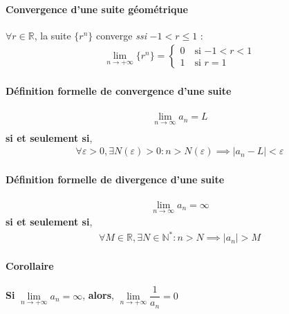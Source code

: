 \documentclass{report}
\begin{document}
\begin{multicols*}{3}
        \paragraph{Convergence d'une suite géométrique}
        $\forall r \in \mathbb{R}$, la suite $\{r^n\}$ converge        
        \textit{ssi} $-1 < r \leq 1$ : 
        \begin{align*}
            \lim\limits_{n\to+\infty }\{r^n\} = 
                    \begin{cases}
                        0 \quad \text{si $-1 < r < 1$} \\
                        1 \quad \text{si $r = 1$}
                    \end{cases}
        \end{align*}


        

    \paragraph{Définition formelle de convergence d'une suite}
      \begin{align*}
        \lim\limits_{n \to\infty  }{a_n} = L \\
      \end{align*}
      \textbf{si et seulement si}, 
      \begin{align*}
        \forall\varepsilon > 0, \exists N\left( \varepsilon \right) > 0 : 
        n > N\left( \varepsilon \right) \implies 
        |a_n -L| < \varepsilon
      \end{align*}



    \paragraph{Définition formelle de divergence d'une suite}
      \begin{align*}
        \lim\limits_{n  \to\infty  }{a_n} = \infty
      \end{align*}
      \textbf{si et seulement si},  
        \begin{align*}
            \forall M \in \mathbb{R}, \exists N \in \mathbb{N}^{*} :
            n > N \implies |a_n| > M 
        \end{align*}

    \paragraph{Corollaire}
    \textbf{Si} $\lim\limits_{n\to+\infty }a_n  = \infty$,  
    \textbf{alors}, 
    $\lim\limits_{n\to+\infty }{\dfrac{1}{a_n}}  = 0$





\end{multicols*}
\end{document}
